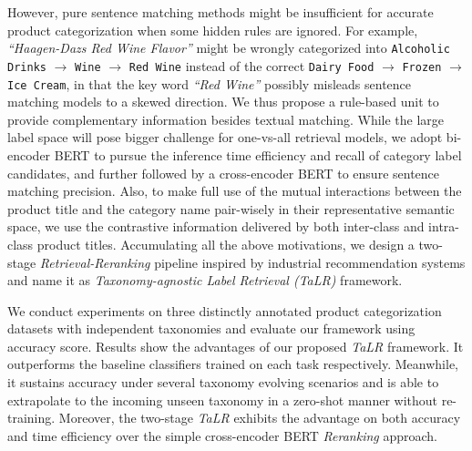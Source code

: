However, pure sentence matching methods might be insufficient for accurate product categorization when some hidden rules are ignored.
For example, \textit{``Haagen-Dazs Red Wine Flavor''} might be wrongly categorized into \verb|Alcoholic Drinks| $\rightarrow$ \verb|Wine| $\rightarrow$ \verb|Red Wine| instead of the correct \verb|Dairy Food| $\rightarrow$ \verb|Frozen| $\rightarrow$ \verb|Ice Cream|, in that the key word \textit{``Red Wine''} possibly misleads sentence matching models to a skewed direction. 
We thus propose a rule-based unit to provide complementary information besides textual matching.
While the large label space will pose bigger challenge for one-vs-all retrieval models, we adopt bi-encoder BERT \cite{devlin-etal-2019-bert} to pursue the inference time efficiency and recall of category label candidates, and further followed by a cross-encoder BERT to ensure sentence matching precision.
Also, to make full use of the mutual interactions between the product title and the category name pair-wisely in their representative semantic space, we use the contrastive information delivered by both inter-class and intra-class product titles.
Accumulating all the above motivations, we design a two-stage \textit{Retrieval-Reranking} pipeline inspired by industrial recommendation systems and name it as \textit{Taxonomy-agnostic Label Retrieval (TaLR)} framework.

We conduct experiments on three distinctly annotated product categorization datasets with independent taxonomies and evaluate our framework using accuracy score. Results show the advantages of our proposed \textit{TaLR} framework. It outperforms the baseline classifiers trained on each task respectively. Meanwhile, it sustains accuracy under several taxonomy evolving scenarios and is able to extrapolate to the incoming unseen taxonomy in a zero-shot manner without re-training.
Moreover, the two-stage \textit{TaLR} exhibits the advantage on both accuracy and time efficiency over the simple cross-encoder BERT \textit{Reranking} approach. 


